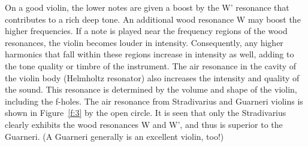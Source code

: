 \documentclass[11pt]{NSF}
\begin{document}
%
On a good
violin, the lower notes are given a boost by the W’ resonance that
contributes to a rich deep tone. An additional wood resonance W may
boost the higher frequencies. If a note is played near the frequency
regions of the wood resonances, the violin becomes louder in
intensity. Consequently, any higher harmonics that fall within these
regions increase in intensity as well, adding to the tone quality or
timbre of the instrument. The air resonance in the cavity of the
violin body (Helmholtz resonator) also increases the intensity and
quality of the sound. This resonance is determined by the volume and
shape of the violin, including the f-holes. The air resonance from
Stradivarius and Guarneri violins is shown in Figure~\ref{f:3} by the open
circle. It is seen that only the Stradivarius clearly exhibits the
wood resonances W and W’, and thus is superior to the Guarneri. (A
Guarneri generally is an excellent violin, too!)
\end{document}
